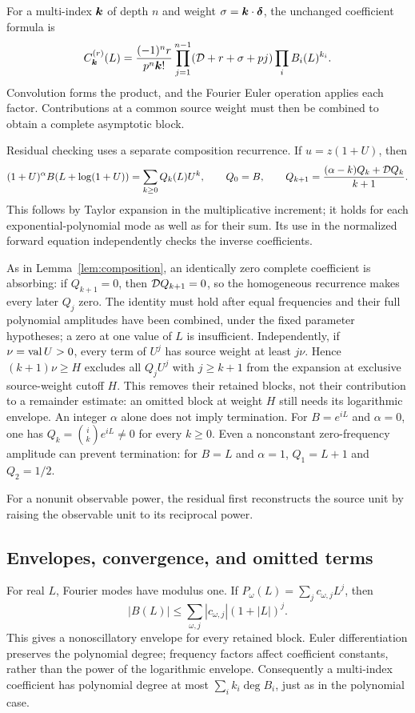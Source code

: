 For a multi-index $\boldsymbol k$ of depth $n$ and weight
$\sigma=\boldsymbol k\cdot\boldsymbol\delta$, the unchanged coefficient formula is
\[
 C^{(r)}_{\boldsymbol k}(L)=\frac{(-1)^n r}{p^n\boldsymbol k!}
 \prod_{j=1}^{n-1}(\mathcal D+r+\sigma+pj)\prod_i B_i(L)^{k_i}.
\]
Convolution forms the product, and the Fourier Euler operation applies each
factor. Contributions at a common source weight must then be combined
to obtain a complete asymptotic block.

Residual checking uses a separate composition recurrence. If
$u=z(1+U)$, then
\[
 (1+U)^\alpha B(L+\log(1+U))=\sum_{k\ge0}Q_k(L)U^k,
 \qquad Q_0=B,\qquad
 Q_{k+1}=\frac{(\alpha-k)Q_k+\mathcal D Q_k}{k+1}.
\]
This follows by Taylor expansion in the multiplicative increment; it holds
for each exponential-polynomial mode as well as for their sum. Its use in
the normalized forward equation independently checks the inverse coefficients.

As in Lemma~\ref{lem:composition}, an identically zero complete coefficient
is absorbing: if $Q_{k+1}=0$, then $\mathcal D Q_{k+1}=0$, so the homogeneous
recurrence makes every later $Q_j$ zero. The identity must hold after equal
frequencies and their full polynomial amplitudes have been combined, under
the fixed parameter hypotheses; a zero at one value of $L$ is insufficient.
Independently, if $\nu=\operatorname{val} U>0$, every term of $U^j$ has source weight at
least $j\nu$. Hence $(k+1)\nu\ge H$ excludes all $Q_jU^j$ with $j\ge k+1$
from the expansion at exclusive source-weight cutoff $H$. This removes
their retained blocks, not their contribution to a remainder estimate:
an omitted block at weight $H$ still needs its logarithmic envelope.
An integer $\alpha$ alone does not imply termination. For $B=e^{iL}$ and
$\alpha=0$, one has $Q_k=\binom{i}{k}e^{iL}\ne0$ for every $k\ge0$.
Even a nonconstant zero-frequency amplitude can prevent termination:
for $B=L$ and $\alpha=1$, $Q_1=L+1$ and $Q_2=1/2$.

For a nonunit observable power, the residual first reconstructs the source
unit by raising the observable unit to its reciprocal power.

\subsection{Envelopes, convergence, and omitted terms}

For real $L$, Fourier modes have modulus one. If
$P_\omega(L)=\sum_j c_{\omega,j}L^j$, then
\[
 |B(L)|\le\sum_{\omega,j}|c_{\omega,j}|(1+|L|)^j.
\]
This gives a nonoscillatory envelope for every retained block. Euler
differentiation preserves the polynomial degree; frequency factors affect
coefficient constants, rather than the power of the logarithmic envelope.
Consequently a multi-index coefficient has polynomial degree at most
$\sum_i k_i\deg B_i$, just as in the polynomial case.

